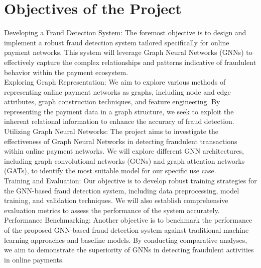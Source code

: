 \section{Objectives of the Project}
\hspace{\parindent}
Developing a Fraud Detection System: The foremost objective is to design and implement a robust fraud detection system tailored specifically for online payment networks. This system will leverage Graph Neural Networks (GNNs) to effectively capture the complex relationships and patterns indicative of fraudulent behavior within the payment ecosystem.\\

Exploring Graph Representation: We aim to explore various methods of representing online payment networks as graphs, including node and edge attributes, graph construction techniques, and feature engineering. By representing the payment data in a graph structure, we seek to exploit the inherent relational information to enhance the accuracy of fraud detection.\\

Utilizing Graph Neural Networks: The project aims to investigate the effectiveness of Graph Neural Networks in detecting fraudulent transactions within online payment networks. We will explore different GNN architectures, including graph convolutional networks (GCNs) and graph attention networks (GATs), to identify the most suitable model for our specific use case.\\

Training and Evaluation: Our objective is to develop robust training strategies for the GNN-based fraud detection system, including data preprocessing, model training, and validation techniques. We will also establish comprehensive evaluation metrics to assess the performance of the system accurately.\\

Performance Benchmarking: Another objective is to benchmark the performance of the proposed GNN-based fraud detection system against traditional machine learning approaches and baseline models. By conducting comparative analyses, we aim to demonstrate the superiority of GNNs in detecting fraudulent activities in online payments.\\

